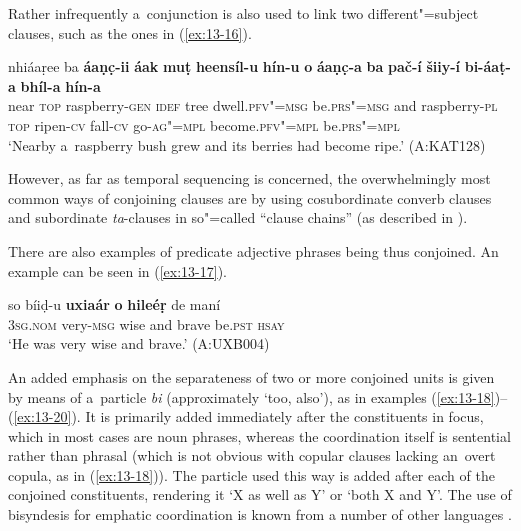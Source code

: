 Rather infrequently a~conjunction is also used to link two different"=subject clauses, such as the ones in (\ref{ex:13-16}).

\begin{exe}
\ex
\label{ex:13-16}
\gll nhiáaṛee ba \textbf{áaṇc̣-ii} \textbf{áak} \textbf{muṭ} \textbf{heensíl-u} \textbf{hín-u} \textbf{o} \textbf{áaṇc̣-a} \textbf{ba} \textbf{pač-í} \textbf{šiiy-í} \textbf{bi-áaṭ-a} \textbf{bhíl-a} \textbf{hín-a} \\
near \textsc{top} raspberry-\textsc{gen} \textsc{idef} tree dwell.\textsc{pfv"=msg}  be.\textsc{prs"=msg} and raspberry-\textsc{pl} \textsc{top} ripen-\textsc{cv} fall-\textsc{cv} go-\textsc{ag"=mpl} become.\textsc{pfv"=mpl} be.\textsc{prs"=mpl} \\
\glt `Nearby a~raspberry bush grew and its berries had become ripe.' (A:KAT128) 
\end{exe}

However, as far as temporal sequencing is concerned, the overwhelmingly most common ways of conjoining clauses are by using cosubordinate converb clauses and subordinate \textit{ta}-clauses in so"=called ``clause chains'' (as described in ).


There are also examples of predicate adjective phrases being thus conjoined. An example can be seen in (\ref{ex:13-17}).

\begin{exe}
\ex
\label{ex:13-17}
\gll so bíiḍ-u \textbf{uxiaár} \textbf{o} \textbf{hileéṛ} de maní  \\
\textsc{3sg.nom} very-\textsc{msg} wise and brave be.\textsc{pst} \textsc{hsay} \\
\glt `He was very wise and brave.' (A:UXB004) 
\end{exe}

 An added emphasis on the separateness of two or more conjoined units is given by means of a~particle \textit{bi} (approximately `too, also'), as in examples (\ref{ex:13-18})--(\ref{ex:13-20}). It is primarily added immediately after the constituents in focus, which in most cases are noun phrases, whereas the coordination itself is sentential rather than phrasal (which is not obvious with copular clauses lacking an~overt copula, as in (\ref{ex:13-18})). The particle used this way is added after each of the conjoined constituents, rendering it `X as well as Y' or `both X and Y'. The use of bisyndesis for emphatic coordination is known from a number of other languages \citep[15--17]{haspelmath2007}. 

